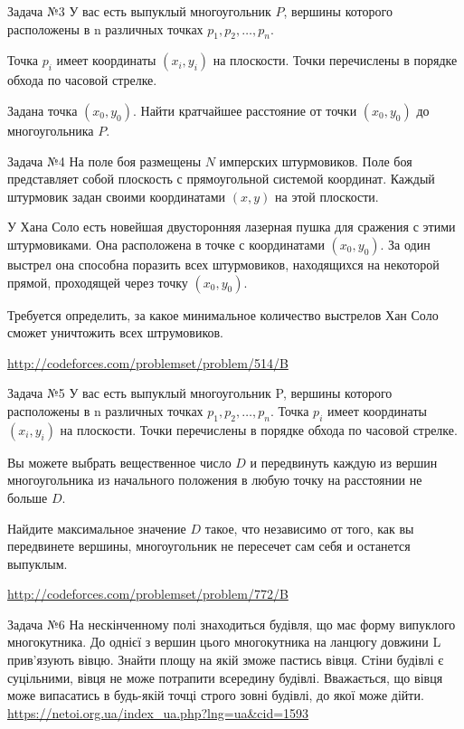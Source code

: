 \documentclass{beamer}
\begin{document}
\begin{frame}{Задача №3}
У вас есть выпуклый многоугольник $P$, вершины которого расположены в n различных точках $p_1, p_2,\ldots, p_n$.\par Точка $p_i$ имеет координаты $(x_i, y_i)$ на плоскости. Точки перечислены в порядке обхода по часовой стрелке.\par
Задана точка $(x_0, y_0)$. Найти кратчайшее расстояние от точки $(x_0, y_0)$ до многоугольника $P$.
\par
\end{frame}

\begin{frame}{Задача №4}
На поле боя размещены $N$ имперских штурмовиков. Поле боя представляет собой плоскость с прямоугольной системой координат. Каждый штурмовик задан своими координатами $(x, y)$ на этой плоскости.\par
У Хана Соло есть новейшая двусторонняя лазерная пушка для сражения с этими штурмовиками. Она расположена в точке с координатами $(x_0, y_0)$. За один выстрел она способна поразить всех штурмовиков, находящихся на некоторой прямой, проходящей через точку $(x_0, y_0)$.\par
Требуется определить, за какое минимальное количество выстрелов Хан Соло сможет уничтожить всех штрумовиков.\par
\url{http://codeforces.com/problemset/problem/514/B}
\end{frame}

\begin{frame}{Задача №5}
У вас есть выпуклый многоугольник P, вершины которого расположены в n различных точках $p_1, p_2,\ldots, p_n$. Точка $p_i$ имеет координаты $(x_i, y_i)$ на плоскости. Точки перечислены в порядке обхода по часовой стрелке.\par
Вы можете выбрать вещественное число $D$ и передвинуть каждую из вершин многоугольника из начального положения в любую точку на расстоянии не больше $D$.\par
Найдите максимальное значение $D$ такое, что независимо от того, как вы передвинете вершины, многоугольник не пересечет сам себя и останется выпуклым.\par
\url{http://codeforces.com/problemset/problem/772/B}
\end{frame}


\begin{frame}{Задача №6}
На нескінченному полі знаходиться будівля, що має форму випуклого многокутника. До однієї з вершин цього многокутника на ланцюгу довжини L прив’язують вівцю. Знайти площу на якій зможе пастись вівця. Стіни будівлі є суцільними, вівця не може потрапити всередину будівлі. Вважається, що вівця може випасатись в будь-якій точці строго зовні будівлі, до якої може дійти.
\url{https://netoi.org.ua/index_ua.php?lng=ua&cid=1593}
\end{frame}
\end{document}
